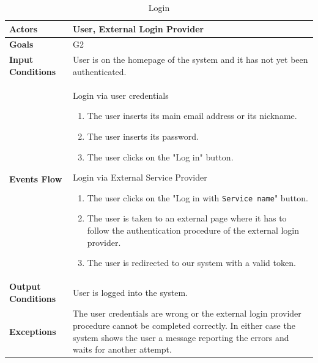 \begin{table}[H]
	\centering
	\def\arraystretch{1.5}
	\begin{tabular}{|p{7cm}|p{7cm}|}
		\hline
		\textbf{Actors}            & User, External Login Provider		    \\ \hline
		\textbf{Goals}             & G2           \\ \hline
		\textbf{Input Conditions}  & User is on the homepage of the system and it has not yet been authenticated.           \\ \hline
		\textbf{Events Flow}       &    
		 	Login via user credentials
			 	\begin{enumerate}
			 		\item The user inserts its main email address or its nickname.
			 		\item The user inserts its password.
			 		\item The user clicks on the "Log in" button.
			 	\end{enumerate}
		 	Login via External Service Provider
			 	\begin{enumerate}
				 	\item The user clicks on the "Log in with \texttt{Service name}" button.
				 	\item The user is taken to an external page where it has to follow the authentication procedure of the external login provider.
				 	\item The user is redirected to our system with a valid token.
			 	\end{enumerate} \\ \hline
		\textbf{Output Conditions} & User is logged into the system.          \\ \hline
		\textbf{Exceptions}        & The user credentials are wrong or the external login provider procedure cannot be completed correctly. In either case the system shows the user a message reporting the errors and waits for another attempt.         \\ \hline
	\end{tabular}
	\caption{Login}
\end{table}

